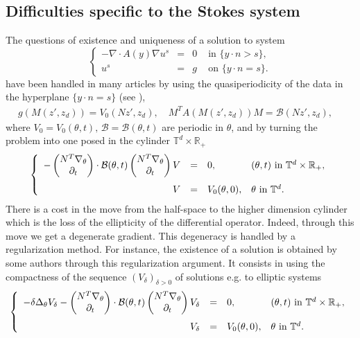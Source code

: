 \documentclass[11pt, reqno]{amsart}
\theoremstyle{definition}
\theoremstyle{remark}
\numberwithin{equation}{section}
\newcommand{\D}{ \left(\!\!\! 
	\begin{array}{c}
		N^T \nabla_{\theta} \\
		\partial_t
	\end{array}
	\!\!\!\right)}
\begin{document}
	\subsection{Difficulties specific to the Stokes system}
	\noindent The questions of existence and uniqueness of a solution to system 
		\begin{equation*}
		\left\{
		\begin{array}{rcll}
			-\nabla\cdot A (y ) \nabla u^s &=& 0  & \mbox{ in } \{ y\cdot n>s \},\\
			u^s&=&g  &\mbox{ on }  \{y\cdot n=s\}.
		\end{array}
		\right. 
	\end{equation*}
	have been handled in many articles by using the quasiperiodicity of the data in the hyperplane $\{ y\cdot n=s\}$ (see \cite{homogen_bl, homogen_polygon,regul_hmgnized_data}),
	\newcommand{\bigB}{\mathcal{B}}
	\begin{align*}
		g( M(z',z_d) )=  V_0( N z',z_d), \quad	  M^TA( M (z',z_d))M=  \mathcal{B} (N z',z_d), \quad
	\end{align*}
	where $ V_0=V_0(\theta, t), \,\mathcal{B}=\bigB(\theta, t)$ are periodic in $\theta$,
		and by turning the problem into one posed in the cylinder $\mathbb{T}^d\times \mathbb{R}_+$
	\begin{equation*}
		\left\{
		\begin{array}{rcll}
			\vspace{.1in}
			-\D\cdot \bigB(\theta, t) \D V &=& 0, &(\theta,t) \mbox{ in }\mathbb{T}^d\times \mathbb{R}_+,\\
			V&=& V_0 (\theta,0),   &\theta\mbox{ in }\mathbb{T}^d.
		\end{array}
		\right. 
	\end{equation*}
	 There is a cost in the move from the half-space to the higher dimension cylinder which is the loss of the ellipticity of the differential operator. Indeed, through this move we get a degenerate gradient. This degeneracy is handled by a regularization method. For instance, the existence of a solution is obtained by some authors through this regularization argument. It consists in using the compactness of the sequence $(V_\delta)_{\delta>0}$ of solutions e.g. to  elliptic systems
	\begin{equation*}
		\left\{
		\begin{array}{rcll}
			\vspace{.1in}
			-\delta \Delta_\theta V_\delta	-\D\cdot \bigB(\theta, t) \D V_\delta &=& 0,  &(\theta,t) \mbox{ in }\mathbb{T}^d\times \mathbb{R}_+,\\
			V_\delta&=& V_0 (\theta,0),   &\theta\mbox{ in }\mathbb{T}^d.
		\end{array}
		\right. 
	\end{equation*}
\end{document}
